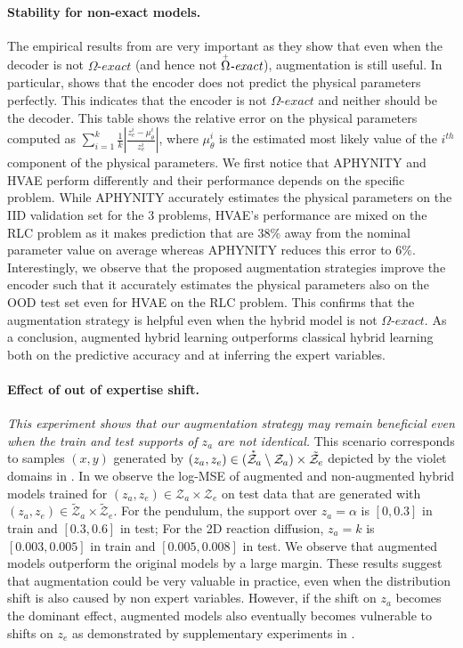 \paragraph{Stability for non-exact models.}
The empirical results from  are very important as they show that even when the decoder is not $\Omega\textit{-exact}$ (and hence not $\accentset{+}{\Omega}\textit{-exact}$), augmentation is still useful. In particular,  shows that the encoder does not predict the physical parameters perfectly. This indicates that the encoder is not $\Omega\textit{-exact}$ and neither should be the decoder. This table shows the relative error on the physical parameters computed as $\sum_{i=1}^k\frac{1}{k}\left|\frac{z_e^i - \mu_\theta^i}{z_e^i}\right|$, where $\mu_\theta^i$ is the estimated most likely value of the $i^{th}$ component of the physical parameters. We first notice that APHYNITY and HVAE perform differently and their performance depends on the specific problem. While APHYNITY accurately estimates the physical parameters on the IID validation set for the 3 problems, HVAE's performance are mixed on the RLC problem as it makes prediction that are $38\%$ away from the nominal parameter value on average whereas APHYNITY reduces this error to $6\%$. Interestingly, we observe that the proposed augmentation strategies improve the encoder such that it accurately estimates the physical parameters also on the OOD test set even for HVAE on the RLC problem. This confirms that the augmentation strategy is helpful even when the hybrid model is not $\Omega\textit{-exact}$. As a conclusion, augmented hybrid learning outperforms classical hybrid learning both on the predictive accuracy and at inferring the expert variables.

\paragraph{Effect of out of expertise shift.}
\textit{This experiment shows that our augmentation strategy may remain beneficial even when the train and test supports of $z_a$ are not identical.} This scenario corresponds to samples $(x, y)$ generated by $(z_a, z_e) \in (\accentset{\ast}{\mathcal{Z}}_a \setminus \mathcal{Z}_a) \times \tilde{\mathcal{Z}}_e$ depicted by the violet domains in . In  we observe the log-MSE of augmented and non-augmented hybrid models trained for $(z_a, z_e) \in \mathcal{Z}_a \times \mathcal{Z}_e$ on test data that are generated with $(z_a, z_e) \in \tilde{\mathcal{Z}}_a \times \tilde{\mathcal{Z}}_e$. For the pendulum, the support over $z_a=\alpha$ is $\left[0, 0.3\right]$ in train and $\left[0.3, 0.6\right]$ in test; For the 2D reaction diffusion, $z_a=k$ is $\left[0.003, 0.005\right]$ in train and $\left[0.005, 0.008\right]$ in test. We observe that augmented models outperform the original models by a large margin. These results suggest that augmentation could be very valuable in practice, even when the distribution shift is also caused by non expert variables. However, if the shift on $z_a$ becomes the dominant effect, augmented models also eventually becomes vulnerable to shifts on $z_e$ as demonstrated by supplementary experiments in .

